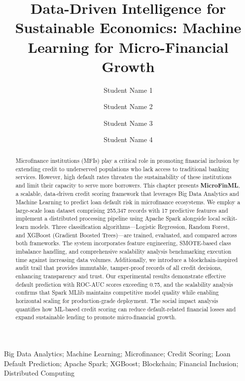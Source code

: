 \documentclass[preprint,12pt,authoryear]{elsarticle}
\begin{document}
\begin{frontmatter}

\title{Data-Driven Intelligence for Sustainable Economics: Machine Learning for Micro-Financial Growth}

\author[somaiya]{Student Name 1}

\author[somaiya]{Student Name 2}

\author[somaiya]{Student Name 3}

\author[somaiya]{Student Name 4}


\begin{abstract}
Microfinance institutions (MFIs) play a critical role in promoting financial inclusion by extending credit to underserved populations who lack access to traditional banking services. However, high default rates threaten the sustainability of these institutions and limit their capacity to serve more borrowers. This chapter presents \textbf{MicroFinML}, a scalable, data-driven credit scoring framework that leverages Big Data Analytics and Machine Learning to predict loan default risk in microfinance ecosystems. We employ a large-scale loan dataset comprising 255,347 records with 17 predictive features and implement a distributed processing pipeline using Apache Spark alongside local scikit-learn models. Three classification algorithms---Logistic Regression, Random Forest, and XGBoost (Gradient Boosted Trees)---are trained, evaluated, and compared across both frameworks. The system incorporates feature engineering, SMOTE-based class imbalance handling, and comprehensive scalability analysis benchmarking execution time against increasing data volumes. Additionally, we introduce a blockchain-inspired audit trail that provides immutable, tamper-proof records of all credit decisions, enhancing transparency and trust. Our experimental results demonstrate effective default prediction with ROC-AUC scores exceeding 0.75, and the scalability analysis confirms that Spark MLlib maintains competitive model quality while enabling horizontal scaling for production-grade deployment. The social impact analysis quantifies how ML-based credit scoring can reduce default-related financial losses and expand sustainable lending to promote micro-financial growth.
\end{abstract}

\begin{keyword}
Big Data Analytics; Machine Learning; Microfinance; Credit Scoring; Loan Default Prediction; Apache Spark; XGBoost; Blockchain; Financial Inclusion; Distributed Computing
\end{keyword}

\end{frontmatter}
\end{document}

